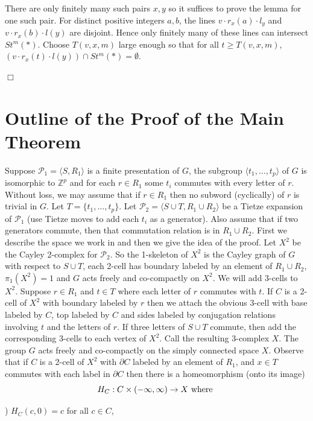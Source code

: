 \documentclass[12pt]{article}
\newenvironment{proof}{\addvspace{12pt}\noindent{\bf Proof:}}{
$\Box$\par\addvspace{12pt}}
\numberwithin{equation}{section}
\begin{document}
\begin{proof}
There are only finitely many such pairs $x,y$ so it suffices to prove the lemma for one such pair. For distinct positive integers  $a,b$, the lines $v\cdot r_x(a)\cdot  l_y$ and $v\cdot r_x(b)\cdot l(y)$ are disjoint. Hence only finitely many of these lines can intersect $St^m(\ast)$. Choose $T(v,x,m)$ large enough so that for all $t\geq T(v,x,m)$, $(v\cdot r_x(t)\cdot l(y))\cap St^m(\ast)=\emptyset$. 
\end{proof}

\section{Outline of the Proof of the Main Theorem}\label{OutL}
Suppose $\mathcal P_1=\langle S,R_1\rangle$ is a finite presentation of $G$, the subgroup $\langle t_1,\ldots, t_p\rangle$ of $G$ is isomorphic to $\mathbb Z^p$ and for each $r\in R_1$ some $t_i$ commutes with every letter of $r$. Without loss, we may assume that if $r\in R_1$ then no subword (cyclically) of $r$ is trivial in $G$. Let $T=\{t_1,\ldots, t_p\}$. Let $\mathcal P_2=\langle S\cup T, R_1\cup R_2\rangle$ be a Tietze expansion of $\mathcal P_1$ (use Tietze moves to add each $t_i$ as a generator). Also assume that if two generators commute, then that commutation relation is in $R_1\cup R_2$. 
First we describe the space we work in and then we give the idea of the proof. Let $X^2$ be the Cayley 2-complex for $\mathcal P_2$. So the 1-skeleton of $X^2$ is the Cayley graph of $G$ with respect to $S\cup T$, each 2-cell has boundary labeled by an element of $R_1\cup R_2$, $\pi_1(X^2)=1$ and $G$ acts freely and co-compactly on $X^2$. We will add 3-cells to $X^2$.  Suppose $r\in R_1$ and $t\in T$ where each letter of $r$ commutes with $t$. If $C$ is a 2-cell of $X^2$ with boundary labeled by $r$ then we attach the obvious 3-cell with base labeled by $C$, top labeled by $C$ and sides labeled by conjugation relations involving $t$ and the letters of $r$. If three letters of $S\cup T$ commute, then add the corresponding 3-cells to each vertex of $X^2$. Call the resulting $3$-complex $X$. The group $G$ acts freely and co-compactly on the simply connected space $X$. Observe that if $C$ is a 2-cell of $X^2$ with $\partial C$ labeled by an element of $R_1$, and $x\in T$ commutes with each label in  $\partial C$ then there is a homeomorphism (onto its image) 
$$H_C:C\times (-\infty, \infty)\to X \hbox{ where }$$ 

) $H_C(c,0)=c$ for all $c\in C$, 
\end{document}
